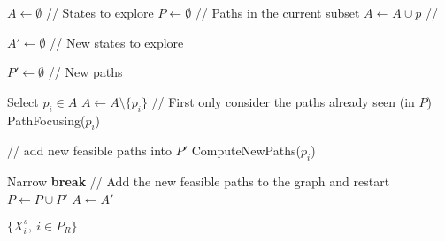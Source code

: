 \label{alg=combined}

\STATE $A \gets \emptyset$ // States to explore
\STATE $P \gets \emptyset$ // Paths in the current subset
	\STATE $A \gets A \cup p$
        // 
\ENDFOR

\STATE $A' \gets \emptyset$ // New states to explore

\STATE $P' \gets \emptyset$ // New paths

 \label{alg=start-ascending}
	\STATE Select $p_i \in A$
	\STATE $A \gets A \setminus \{p_i\}$
	\STATE // First only consider the paths already seen (in $P$)
	\STATE PathFocusing($p_i$)
	
	\STATE // add new feasible paths into $P'$
	\STATE ComputeNewPaths($p_i$)

\ENDWHILE \label{alg=end-ascending}
\STATE Narrow \label{alg=narrowing}
 \label{alg=start-add-paths}
	\STATE \textbf{break}
\ENDIF \label{alg=end-add-paths}
\STATE // Add the new feasible paths to the graph and restart 
\STATE $P \gets P \cup P'$
\STATE $A \gets A'$
\ENDWHILE

\STATE \RETURN $\{X_i^s,\ i \in P_R\}$

